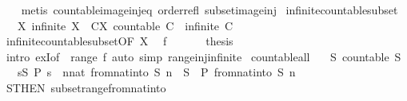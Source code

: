 \begin{isabellebody}
%
\isadelimproof
\ \ %
\endisadelimproof
%
\isatagproof
{}\isamarkupfalse%
\ {\isacharparenleft}metis\ countable{\isacharunderscore}image{\isacharunderscore}inj{\isacharunderscore}eq\ order{\isacharunderscore}refl\ subset{\isacharunderscore}image{\isacharunderscore}inj{\isacharparenright}%
\endisatagproof
{\isafoldproof}%
%
\isadelimproof
\isanewline
%
\endisadelimproof
\isanewline
{}\isamarkupfalse%
\ infinite{\isacharunderscore}countable{\isacharunderscore}subset{\isacharprime}{\isacharcolon}\isanewline
\ \ \ X{\isacharcolon}\ {\isachardoublequoteopen}infinite\ X{\isachardoublequoteclose}\ \ {\isachardoublequoteopen}{\isasymexists}C{\isasymsubseteq}X{\isachardot}\ countable\ C\ {\isasymand}\ infinite\ C{\isachardoublequoteclose}\isanewline
%
\isadelimproof
%
\endisadelimproof
%
\isatagproof
{}\isamarkupfalse%
\ {\isacharminus}\isanewline
\ \ \isamarkupfalse%
\ infinite{\isacharunderscore}countable{\isacharunderscore}subset{\isacharbrackleft}OF\ X{\isacharbrackright}\ \isamarkupfalse%
\ f\ \isacommand{{\isachardot}{\isachardot}}\isamarkupfalse%
\isanewline
\ \ \isamarkupfalse%
\ \isamarkupfalse%
\ {\isacharquery}thesis\isanewline
\ \ \ \ \isamarkupfalse%
\ {\isacharparenleft}intro\ exI{\isacharbrackleft}of\ {\isacharunderscore}\ {\isachardoublequoteopen}range\ f{\isachardoublequoteclose}{\isacharbrackright}{\isacharparenright}\ {\isacharparenleft}auto\ simp{\isacharcolon}\ range{\isacharunderscore}inj{\isacharunderscore}infinite{\isacharparenright}\isanewline
{}\isamarkupfalse%
%
\endisatagproof
{\isafoldproof}%
%
\isadelimproof
\isanewline
%
\endisadelimproof
\isanewline
{}\isamarkupfalse%
\ countable{\isacharunderscore}all{\isacharcolon}\isanewline
\ \ \ S{\isacharcolon}\ {\isachardoublequoteopen}countable\ S{\isachardoublequoteclose}\isanewline
\ \ \ {\isachardoublequoteopen}{\isacharparenleft}{\isasymforall}s{\isasymin}S{\isachardot}\ P\ s{\isacharparenright}\ {\isasymlongleftrightarrow}\ {\isacharparenleft}{\isasymforall}n{\isacharcolon}{\isacharcolon}nat{\isachardot}\ from{\isacharunderscore}nat{\isacharunderscore}into\ S\ n\ {\isasymin}\ S\ {\isasymlongrightarrow}\ P\ {\isacharparenleft}from{\isacharunderscore}nat{\isacharunderscore}into\ S\ n{\isacharparenright}{\isacharparenright}{\isachardoublequoteclose}\isanewline
%
\isadelimproof
\ \ %
\endisadelimproof
%
\isatagproof
{}\isamarkupfalse%
\ S{\isacharbrackleft}THEN\ subset{\isacharunderscore}range{\isacharunderscore}from{\isacharunderscore}nat{\isacharunderscore}into{\isacharbrackright}\ \isamarkupfalse%

\end{isabellebody}
